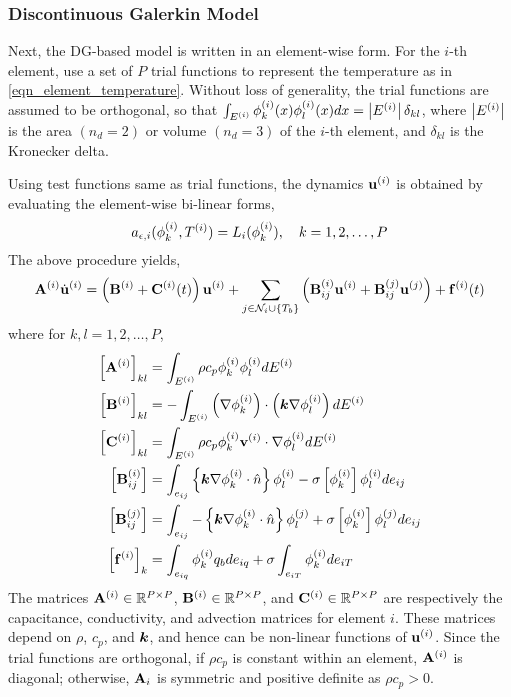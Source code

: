 \subsubsection{Discontinuous Galerkin Model}

Next, the DG-based model is written in an element-wise form. For the $i$-th element, use a set of $P$ trial functions to represent the temperature as in \cref{eqn_element_temperature}. Without loss of generality, the trial functions are assumed to be orthogonal, so that $\int_{E^{(i)}} \phi^{(i)}_k(x) \phi^{(i)}_l(x) dx = \left|E^{(i)}\right|\delta_{kl}$, where $\left|E^{(i)}\right|$ is the area $(n_d=2)$ or volume $(n_d=3)$ of the $i$-th element, and $\delta_{kl}$ is the Kronecker delta.

Using test functions same as trial functions, the dynamics $\mathbf{u}^{(i)}$ is obtained by evaluating the element-wise bi-linear forms,
\begin{equation}
    a_{\epsilon,i}(\phi_k^{(i)},T^{(i)}) = L_i(\phi_k^{(i)}),\quad k=1,2,\dots,P
\end{equation}
The above procedure yields,
\begin{equation}
    \mathbf{A}^{(i)}\dot{\mathbf{u}}^{(i)} = \left(\mathbf{B}^{(i)} + \mathbf{C}^{(i)}(t)\right)\mathbf{u}^{(i)} + \sum_{j\in\mathcal{N}_i\cup\left\{T_b\right\}}\left(\mathbf{B}^{(i)}_{ij}\mathbf{u}^{(i)} + \mathbf{B}^{(j)}_{ij}\mathbf{u}^{(j)}\right) + \mathbf{f}^{(i)}(t)\label{eqn_element_wise_model}
\end{equation}
where for $k,l=1,2,\dots,P$,
\begin{subequations}
    \begin{align}
        \left[\mathbf{A}^{(i)}\right]_{kl} &= \int_{E^{(i)}}\rho c_p\phi_k^{(i)}\phi_l^{(i)}dE^{(i)}\\
        \left[\mathbf{B}^{(i)}\right]_{kl} &= -\int_{E^{(i)}}\left(\nabla\phi_k^{(i)}\right)\cdot\left(\boldsymbol{k}\nabla\phi_l^{(i)}\right)dE^{(i)}\\
        \left[\mathbf{C}^{(i)}\right]_{kl} &= \int_{E^{(i)}}\rho c_p \phi_k^{(i)}\mathbf{v}^{(i)}\cdot\nabla\phi_l^{(i)}dE^{(i)}\label{eqn_advection_matrix_element_kl}\\
        \left[\mathbf{B}^{(i)}_{ij}\right] &= \int_{e_{ij}}\left\{\boldsymbol{k}\nabla\phi_k^{(i)}\cdot\hat{n}\right\}\phi_l^{(i)} - \sigma\left[\phi_k^{(i)}\right]\phi_l^{(i)}de_{ij}\\
        \left[\mathbf{B}^{(j)}_{ij}\right] &= \int_{e_{ij}}-\left\{\boldsymbol{k}\nabla\phi_k^{(i)}\cdot\hat{n}\right\}\phi_l^{(j)} + \sigma\left[\phi_k^{(i)}\right]\phi_l^{(j)}de_{ij}\\
        \left[\mathbf{f}^{(i)}\right]_k &= \int_{e_{iq}}\phi_k^{(i)}q_bde_{iq} + \sigma\int_{e_{iT}}\phi_k^{(i)}de_{iT}
    \end{align}
\end{subequations}
The matrices $\mathbf{A}^{(i)}\in\mathbb{R}^{P\times P}$, $\mathbf{B}^{(i)}\in\mathbb{R}^{P\times P}$, and $\mathbf{C}^{(i)}\in\mathbb{R}^{P\times P}$ are respectively the capacitance, conductivity, and advection matrices for element $i$. These matrices depend on $\rho$, $c_p$, and $\boldsymbol{k}$, and hence can be non-linear functions of $\mathbf{u}^{(i)}$. Since the trial functions are orthogonal, if $\rho c_p$ is constant within an element, $\mathbf{A}^{(i)}$ is diagonal; otherwise, $\mathbf{A}_i$ is symmetric and positive definite as $\rho c_p > 0$.

